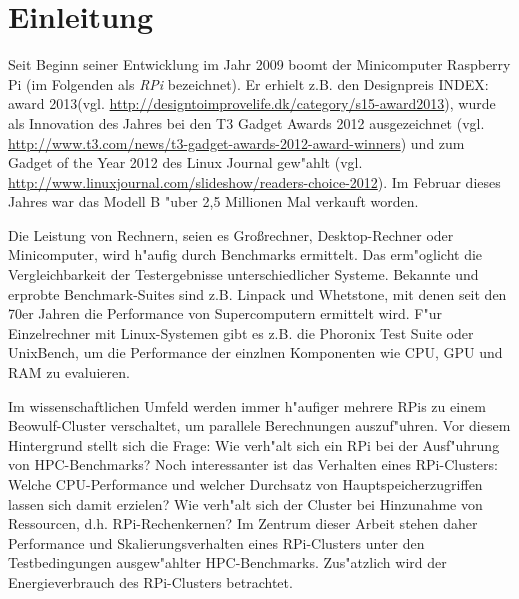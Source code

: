 \chapter{Einleitung}\label{Kap1}
\enlargethispage{0.7cm}
Seit Beginn seiner Entwicklung im Jahr 2009 boomt der Minicomputer Raspberry Pi (im Folgenden als \textit{RPi} bezeichnet). Er erhielt z.B. den Designpreis INDEX: award 2013\newline(vgl. \url{http://designtoimprovelife.dk/category/s15-award2013}), wurde als Innovation des Jahres bei den T3 Gadget Awards 2012 ausgezeichnet (vgl. \url{http://www.t3.com/news/t3-gadget-awards-2012-award-winners}) und zum Gadget of the Year 2012 des Linux Journal gew"ahlt (vgl. \url{http://www.linuxjournal.com/slideshow/readers-choice-2012}). Im Februar dieses Jahres war das Modell B "uber 2,5 Millionen Mal verkauft worden. 

Die Leistung von Rechnern, seien es Gro\ss rechner, Desktop-Rechner oder Minicomputer, wird h"aufig durch Benchmarks ermittelt. Das erm"oglicht die Vergleichbarkeit der Testergebnisse unterschiedlicher Systeme. Bekannte und erprobte Benchmark-Suites sind z.B. Linpack und Whetstone, mit denen seit den 70er Jahren die Performance von Supercomputern ermittelt wird. F"ur Einzelrechner mit Linux-Systemen gibt es z.B. die Phoronix Test Suite oder UnixBench, um die Performance der einzlnen Komponenten wie CPU, GPU und RAM zu evaluieren. 

Im wissenschaftlichen Umfeld werden immer h"aufiger mehrere RPis zu einem Beowulf-Cluster %
verschaltet, um parallele Berechnungen auszuf"uhren. Vor diesem Hintergrund stellt sich die Frage: Wie verh"alt sich ein RPi bei der Ausf"uhrung von HPC-Benchmarks? Noch interessanter ist das Verhalten eines RPi-Clusters: Welche CPU-Performance und welcher Durchsatz von Hauptspeicherzugriffen lassen sich damit erzielen? Wie verh"alt sich der Cluster bei Hinzunahme von Ressourcen, d.h. RPi-Rechenkernen? Im Zentrum dieser Arbeit stehen daher Performance und Skalierungsverhalten eines RPi-Clusters unter den Testbedingungen ausgew"ahlter HPC-Benchmarks. Zus"atzlich wird der Energieverbrauch des RPi-Clusters betrachtet. 

